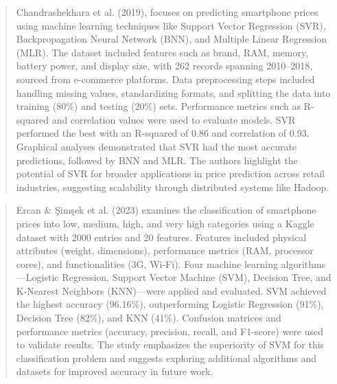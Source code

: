 \documentclass[12pt]{report}
\begin{document}
\begin{quotation}
  Chandrashekhara et al. \cite{chandrashekhara2019} (2019), focuses on predicting smartphone prices using machine learning techniques like Support Vector Regression (SVR), Backpropagation Neural Network (BNN), and Multiple Linear Regression (MLR). The dataset included features such as brand, RAM, memory, battery power, and display size, with 262 records spanning 2010–2018, sourced from e-commerce platforms. Data preprocessing steps included handling missing values, standardizing formats, and splitting the data into training (80\%) and testing (20\%) sets. Performance metrics such as R-squared and correlation values were used to evaluate models. SVR performed the best with an R-squared of 0.86 and correlation of 0.93. Graphical analyses demonstrated that SVR had the most accurate predictions, followed by BNN and MLR. The authors highlight the potential of SVR for broader applications in price prediction across retail industries, suggesting scalability through distributed systems like Hadoop.
\end{quotation}

\begin{quotation}
  Ercan \& Şimşek et al. \cite{ercan2023} (2023) examines the classification of smartphone prices into low, medium, high, and very high categories using a Kaggle dataset with 2000 entries and 20 features. Features included physical attributes (weight, dimensions), performance metrics (RAM, processor cores), and functionalities (3G, Wi-Fi). Four machine learning algorithms—Logistic Regression, Support Vector Machine (SVM), Decision Tree, and K-Nearest Neighbors (KNN)—were applied and evaluated. SVM achieved the highest accuracy (96.16\%), outperforming Logistic Regression (91\%), Decision Tree (82\%), and KNN (41\%). Confusion matrices and performance metrics (accuracy, precision, recall, and F1-score) were used to validate results. The study emphasizes the superiority of SVM for this classification problem and suggests exploring additional algorithms and datasets for improved accuracy in future work.
\end{quotation}
\end{document}
